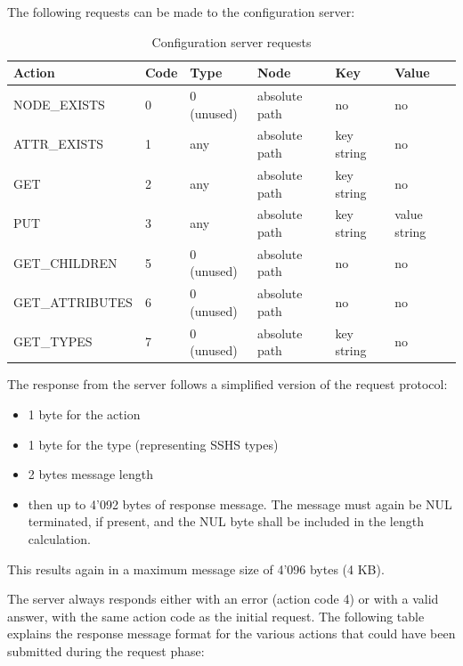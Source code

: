 \documentclass[a4paper,12pt]{report}
\begin{document}
The following requests can be made to the configuration server:

\begin{table}[H]
\begin{center}
\caption{Configuration server requests}
\label{tab:configuration_server_requests}
\begin{tabu} to \linewidth {|l|l|X|X|X|X|}
\hline
Action & Code & Type & Node & Key & Value \\ \hline
NODE\_EXISTS & 0 & 0 (unused) & absolute path & no & no \\ \hline
ATTR\_EXISTS & 1 & any & absolute path & key string & no \\ \hline
GET & 2 & any & absolute path & key string & no \\ \hline
PUT & 3 & any & absolute path & key string & value string \\ \hline
GET\_CHILDREN & 5 & 0 (unused) & absolute path & no & no \\ \hline
GET\_ATTRIBUTES & 6 & 0 (unused) & absolute path & no & no \\ \hline
GET\_TYPES & 7 & 0 (unused) & absolute path & key string & no \\ \hline
\end{tabu}
\end{center}
\end{table}
\clearpage
The response from the server follows a simplified version of the request protocol:
\begin{itemize}
\item 1 byte for the action
\item 1 byte for the type (representing SSHS types)
\item 2 bytes message length
\item then up to 4'092 bytes of response message. The message must again be NUL terminated, if present, and the NUL byte shall be included in the length calculation.
\end{itemize}
This results again in a maximum message size of 4'096 bytes (4 KB).

The server always responds either with an error (action code 4) or with a valid answer, with the same action code as the initial request.
The following table explains the response message format for the various actions that could have been submitted during the request phase:
\end{document}
